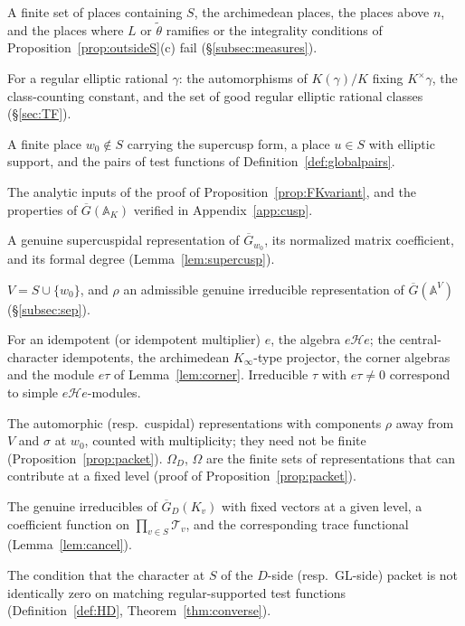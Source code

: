 \documentclass[12pt]{article}
\newcommand{\ov}[1]{\overline{#1}}
\newcommand{\A}{\mathbb{A}}
\newcommand{\GL}{\mathrm{GL}}
\newcommand{\Gb}{\ov{G}}
\newcommand{\GDb}{\ov{G}_D}
\theoremstyle{plain}
\theoremstyle{definition}
\begin{document}
\begin{description}[style=nextline,leftmargin=1.5em]
\item[$S_D$] A finite set of places containing $S$, the archimedean places, the places above $n$, and the places where $L$ or $\tilde\theta$ ramifies or the integrality conditions of Proposition~\ref{prop:outsideS}(c) fail (\S\ref{subsec:measures}).
\item[$W_\gamma$, $c(\gamma)$, $\mathcal O_H$] For a regular elliptic rational $\gamma$: the automorphisms of $K(\gamma)/K$ fixing $K^\times\gamma$, the class-counting constant, and the set of good regular elliptic rational classes (\S\ref{sec:TF}).
\item[$w_0$, $u$; admissible pair] A finite place $w_0\notin S$ carrying the supercusp form, a place $u\in S$ with elliptic support, and the pairs of test functions of Definition~\ref{def:globalpairs}.
\item[(A1), (A2); (R1)--(R5)] The analytic inputs of the proof of Proposition~\ref{prop:FKvariant}, and the properties of $\Gb(\A_K)$ verified in Appendix~\ref{app:cusp}.
\item[$\sigma$, $\tilde f_\sigma$, $d(\sigma)$] A genuine supercuspidal representation of $\Gb_{w_0}$, its normalized matrix coefficient, and its formal degree (Lemma~\ref{lem:supercusp}).
\item[$V$, $\rho$] $V=S\cup\{w_0\}$, and $\rho$ an admissible genuine irreducible representation of $\Gb(\A^V)$ (\S\ref{subsec:sep}).
\item[Corner Hecke algebra; $e_v$, $e_{\mathfrak t}$, $A_v$, $A_\infty$, $A$, $e\tau$] For an idempotent (or idempotent multiplier) $e$, the algebra $e\mathcal He$; the central-character idempotents, the archimedean $K_\infty$-type projector, the corner algebras and the module $e\tau$ of Lemma~\ref{lem:corner}. Irreducible $\tau$ with $e\tau\ne0$ correspond to simple $e\mathcal He$-modules.
\item[Near-equivalence packets $P_D(\rho)$, $P(\rho)$] The automorphic (resp.\ cuspidal) representations with components $\rho$ away from $V$ and $\sigma$ at $w_0$, counted with multiplicity; they need not be finite (Proposition~\ref{prop:packet}). $\Omega_D$, $\Omega$ are the finite sets of representations that can contribute at a fixed level (proof of Proposition~\ref{prop:packet}).
\item[$\mathcal T_v$, $a$, $\Lambda_a$] The genuine irreducibles of $\GDb(K_v)$ with fixed vectors at a given level, a coefficient function on $\prod_{v\in S}\mathcal T_v$, and the corresponding trace functional (Lemma~\ref{lem:cancel}).
\item[$(\mathrm H_D)$, (H); elliptic detectability] The condition that the character at $S$ of the $D$-side (resp.\ $\GL$-side) packet is not identically zero on matching regular-supported test functions (Definition~\ref{def:HD}, Theorem~\ref{thm:converse}).

\end{description}
\end{document}
